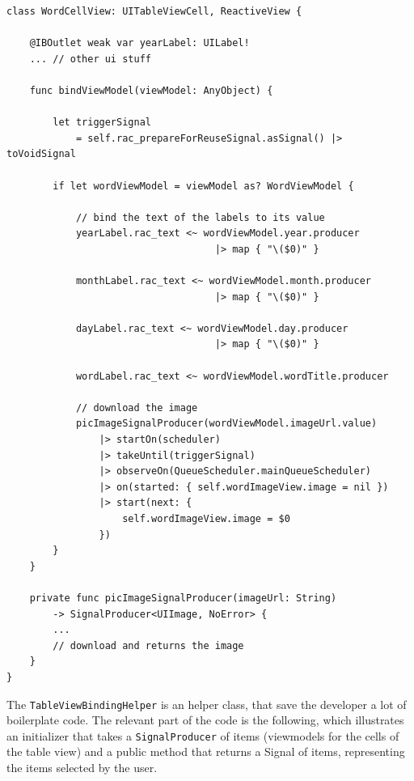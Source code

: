 \begin{verbatim}
class WordCellView: UITableViewCell, ReactiveView {

    @IBOutlet weak var yearLabel: UILabel!
    ... // other ui stuff

    func bindViewModel(viewModel: AnyObject) {

        let triggerSignal 
        	= self.rac_prepareForReuseSignal.asSignal() |> toVoidSignal

        if let wordViewModel = viewModel as? WordViewModel {
        
            // bind the text of the labels to its value
            yearLabel.rac_text <~ wordViewModel.year.producer 
            						|> map { "\($0)" }
            						
            monthLabel.rac_text <~ wordViewModel.month.producer 
            						|> map { "\($0)" }
            						
            dayLabel.rac_text <~ wordViewModel.day.producer 
            						|> map { "\($0)" }
            						
            wordLabel.rac_text <~ wordViewModel.wordTitle.producer

            // download the image
            picImageSignalProducer(wordViewModel.imageUrl.value)
                |> startOn(scheduler)
                |> takeUntil(triggerSignal)
                |> observeOn(QueueScheduler.mainQueueScheduler)
                |> on(started: { self.wordImageView.image = nil })
                |> start(next: {
                    self.wordImageView.image = $0
                })
        }
    }

    private func picImageSignalProducer(imageUrl: String)
        -> SignalProducer<UIImage, NoError> {
        ...
        // download and returns the image
    }
}
\end{verbatim}

The \texttt{TableViewBindingHelper} is an helper class, that save the
developer a lot of boilerplate code. The relevant part of the code is
the following, which illustrates an initializer that takes a
\texttt{SignalProducer} of items (viewmodels for the cells of the table
view) and a public method that returns a Signal of items, representing
the items selected by the user.


